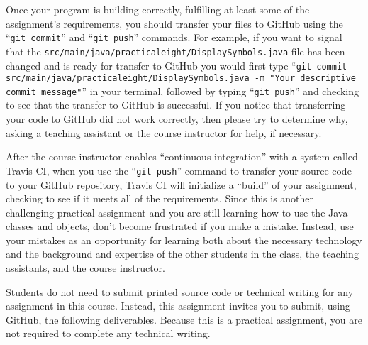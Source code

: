 \documentclass[11pt]{article}
\newcommand{\mainprogramsource}{\lstinline{src/main/java/practicaleight/DisplaySymbols.java}}
\newcommand{\gitcommit}{\command{git commit}}
\newcommand{\gitpush}{\command{git push}}
\newcommand{\gitcommitmainprogram}{\command{git commit src/main/java/practicaleight/DisplaySymbols.java -m "Your
descriptive commit message"}}
\newcommand{\command}[1]{``\lstinline{#1}''}
\newcommand{\step}[1]{``{#1}''}
\newcommand{\checkmark}{\ding{51}}
\newcommand{\naughtmark}{\ding{55}}
\begin{document}
Once your program is building correctly, fulfilling at least some of the assignment's requirements, you should transfer
your files to GitHub using the \gitcommit{} and \gitpush{} commands. For example, if you want to signal that the
\mainprogramsource{} file has been changed and is ready for transfer to GitHub you would first type
\gitcommitmainprogram{} in your terminal, followed by typing \gitpush{} and checking to see that the transfer to GitHub
is successful. If you notice that transferring your code to GitHub did not work correctly, then please try to determine
why, asking a teaching assistant or the course instructor for help, if necessary.


After the course instructor enables \step{continuous integration} with a system called Travis CI, when you use the
\gitpush{} command to transfer your source code to your GitHub repository, Travis CI will initialize a \step{build} of
your assignment, checking to see if it meets all of the requirements. Since this is another challenging practical
assignment and you are still learning how to use the Java classes and objects, don't become frustrated if you make a
mistake. Instead, use your mistakes as an opportunity for learning both about the necessary technology and the
background and expertise of the other students in the class, the teaching assistants, and the course instructor.

\noindent Students do not need to submit printed source code or technical writing for any assignment in this course.
Instead, this assignment invites you to submit, using GitHub, the following deliverables. Because this is a practical
assignment, you are not required to complete any technical writing.
\end{document}
